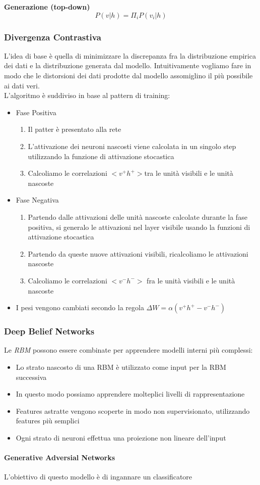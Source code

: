 \textbf{Generazione (top-down)}
\[P(v|h) = \Pi_i P(v_i|h)\]

\subsubsection{Divergenza Contrastiva}
L'idea di base è quella di minimizzare la discrepanza fra la distribuzione empirica dei dati e la distribuzione generata dal modello. Intuitivamente vogliamo fare in modo che le distorsioni dei dati prodotte dal modello assomiglino il più possibile ai dati veri.\\
L'algoritmo è suddiviso in base al pattern di training:
\begin{itemize}
    \item Fase Positiva
    \begin{enumerate}
        \item Il patter è presentato alla rete
        \item L'attivazione dei neuroni nascosti viene calcolata in un singolo step utilizzando la funzione di attivazione stocastica
        \item Calcoliamo le correlazioni \(<v^+h^+>\)tra le unità visibili e le unità nascoste
    \end{enumerate}

    \item Fase Negativa
    \begin{enumerate}
        \item Partendo dalle attivazioni delle unità nascoste calcolate durante la fase positiva, si generalo le attivazioni nel layer visibile usando la funzioni di attivazione stocastica
        \item Partendo da queste nuove attivazioni visibili, ricalcoliamo le attivazioni nascoste
        \item Calcoliamo le correlazioni \(<v^-h^->\) fra le unità visibili e le unità nascoste
    \end{enumerate}

    \item I pesi vengono cambiati secondo la regola \(\Delta W = \alpha (v^+h^+ - v^-h^-)\)

\end{itemize}

\subsubsection{Deep Belief Networks}
Le \textit{RBM} possono essere combinate per apprendere modelli interni più complessi:
\begin{itemize}
    \item Lo strato nascosto di una RBM è utilizzato come input per la RBM successiva
    \item In questo modo possiamo apprendere molteplici livelli di rappresentazione
    \item Features astratte vengono scoperte in modo non supervisionato, utilizzando features più semplici
    \item Ogni strato di neuroni effettua una proiezione non lineare dell'input
\end{itemize}

\paragraph{Generative Adversial Networks}
L'obiettivo di questo modello è di ingannare un classificatore

